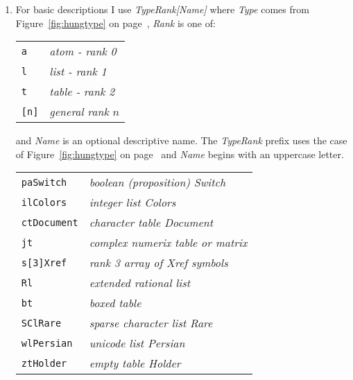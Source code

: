 \begin{enumerate}
	\item For basic descriptions I use \textsl{TypeRank[Name]}  where \textsl{Type} comes
	from Figure~\ref{fig:hungtype} on page~\pageref{fig:hungtype}, \textsl{Rank} is one of: 
	\begin{center}
	 \footnotesize
\begin{tabular}{ll}
   \texttt{a} & \textcolor{CodeComment}{\ttfamily\textsl{atom - rank 0}} \\ 
   \texttt{l} & \textcolor{CodeComment}{\ttfamily\textsl{list - rank 1}}  \\
   \texttt{t} & \textcolor{CodeComment}{\ttfamily\textsl{table - rank 2}} \\   
   \texttt{[n]} & \textcolor{CodeComment}{\ttfamily\textsl{general rank $n$}} \\ 
\end{tabular}
\end{center}
and \textsl{Name} is an optional descriptive name.  The \textsl{TypeRank} prefix uses
the case of Figure~\ref{fig:hungtype} on page~\pageref{fig:hungtype} and \textsl{Name} begins with an uppercase letter.
 \begin{center}
 \footnotesize
\begin{tabular}{ll}
   \texttt{paSwitch} & \textcolor{CodeComment}{\ttfamily\textsl{boolean (proposition) Switch}} \\ 
   \texttt{ilColors} & \textcolor{CodeComment}{\ttfamily\textsl{integer list Colors}}  \\
   \texttt{ctDocument} & \textcolor{CodeComment}{\ttfamily\textsl{character table Document}} \\   
   \texttt{jt} & \textcolor{CodeComment}{\ttfamily\textsl{complex numerix table or matrix}} \\ 
   \texttt{s[3]Xref} & \textcolor{CodeComment}{\ttfamily\textsl{rank 3 array of Xref symbols}} \\ 
   \texttt{Rl} & \textcolor{CodeComment}{\ttfamily\textsl{extended rational list}} \\ 
   \texttt{bt} & \textcolor{CodeComment}{\ttfamily\textsl{boxed table}} \\
   \texttt{SClRare} & \textcolor{CodeComment}{\ttfamily\textsl{sparse character list Rare}} \\
   \texttt{wlPersian} & \textcolor{CodeComment}{\ttfamily\textsl{unicode list Persian}} \\ 
   \texttt{ztHolder} & \textcolor{CodeComment}{\ttfamily\textsl{empty table Holder}} \\ 

\end{tabular}
\end{center}
\end{enumerate}
